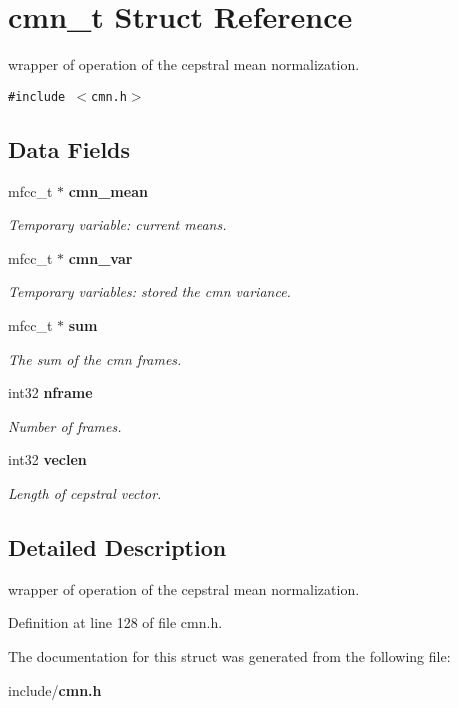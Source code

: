 \section{cmn\_\-t Struct Reference}
\label{structcmn__t}
wrapper of operation of the cepstral mean normalization.  


{\tt \#include $<$cmn.h$>$}

\subsection*{Data Fields}
\begin{CompactItemize}
\item 
mfcc\_\-t $\ast$ {\bf cmn\_\-mean}\label{structcmn__t_ef0faa6cd93f1d9cf12659c5980aefd2}

\begin{CompactList}\small\item\em Temporary variable: current means. \item\end{CompactList}\item 
mfcc\_\-t $\ast$ {\bf cmn\_\-var}\label{structcmn__t_72813f1c9423186f5bd66ecb39099eb5}

\begin{CompactList}\small\item\em Temporary variables: stored the cmn variance. \item\end{CompactList}\item 
mfcc\_\-t $\ast$ {\bf sum}\label{structcmn__t_db70819b1ca822d5a4ee6dc94b3b48e7}

\begin{CompactList}\small\item\em The sum of the cmn frames. \item\end{CompactList}\item 
int32 {\bf nframe}\label{structcmn__t_456cc3313e93fa3057b658fef64a0c53}

\begin{CompactList}\small\item\em Number of frames. \item\end{CompactList}\item 
int32 {\bf veclen}\label{structcmn__t_10472e0ad9272f764b512ade43f37d69}

\begin{CompactList}\small\item\em Length of cepstral vector. \item\end{CompactList}\end{CompactItemize}


\subsection{Detailed Description}
wrapper of operation of the cepstral mean normalization. 

Definition at line 128 of file cmn.h.

The documentation for this struct was generated from the following file:\begin{CompactItemize}
\item 
include/{\bf cmn.h}\end{CompactItemize}

